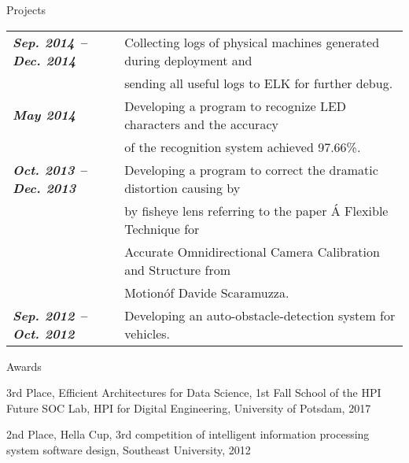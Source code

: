 \documentclass{resume} %
\begin{document}
\newpage
\begin{rSection}{Projects}
  \begin{tabular}{ @{} >{\bfseries}l @{\hspace{6ex}} l }

    {\em Sep. 2014 – Dec. 2014} &  Collecting logs of physical machines generated during deployment and \\
    {\ }  & sending all useful logs to ELK for further debug. \\

    {\em May 2014} & Developing a program to recognize LED characters and the accuracy \\
    {\ } & of the recognition system achieved 97.66\%. \\

    {\em Oct. 2013 – Dec. 2013} &  Developing a program to correct the dramatic distortion causing by \\
    {\ } & by fisheye lens referring to the paper \'A Flexible Technique for \\
    {\ } & Accurate Omnidirectional Camera Calibration and Structure from \\
    {\ } & Motion\' of Davide Scaramuzza. \\

    {\em Sep. 2012 – Oct. 2012} & Developing an auto-obstacle-detection system for vehicles. \\

  \end{tabular}

\end{rSection}





\begin{rSection}{Awards} \itemsep -3pt
  \item 3rd Place, Efficient Architectures for Data Science, 1st Fall School of the HPI Future SOC Lab, HPI for Digital Engineering, University of Potsdam, 2017
  \item 2nd Place, Hella Cup, 3rd competition of intelligent information processing system software design, Southeast University, 2012
\end{rSection}
\end{document}
